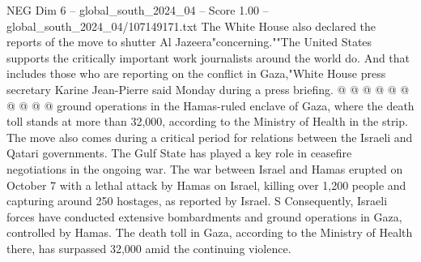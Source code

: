 \begin{textsample}{NEG Dim 6 – global\_south\_2024\_04 – Score 1.00 – global\_south\_2024\_04/107149171.txt}
The White House also declared the reports of the move to shutter Al Jazeera"concerning.""The United States supports the critically important work journalists around the world do.
And that includes those who are reporting on the conflict in Gaza,"White House press secretary Karine Jean-Pierre said Monday during a press briefing. @ @ @ @ @ @ @ @ @ @ ground operations in the Hamas-ruled enclave of Gaza, where the death toll stands at more than 32,000, according to the Ministry of Health in the strip.
The move also comes during a critical period for relations between the Israeli and Qatari governments.
The Gulf State has played a key role in ceasefire negotiations in the ongoing war.
The war between Israel and Hamas erupted on October 7 with a lethal attack by Hamas on Israel, killing over 1,200 people and capturing around 250 hostages, as reported by Israel.
S Consequently, Israeli forces have conducted extensive bombardments and ground operations in Gaza, controlled by Hamas.
The death toll in Gaza, according to the Ministry of Health there, has surpassed 32,000 amid the continuing violence.

\end{textsample}
